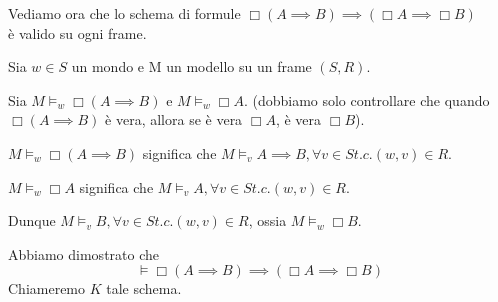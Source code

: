 \documentclass[../main.tex]{subfiles}
\begin{document}
Vediamo ora che lo schema di formule $\Box (A \implies B) \implies (\Box A \implies \Box B)$ \\
è valido su ogni frame.

Sia $w \in S$ un mondo e M un modello su un frame $(S,R)$.

Sia $M \vDash_w \Box (A \implies B)$ e $M \vDash_w \Box A$. (dobbiamo solo controllare che quando $\Box ( A \implies B )$ è vera, allora se è vera $\Box A$, è vera $\Box B$).

$M \vDash_w \Box (A \implies B)$ significa che $M \vDash_v A \implies B, \forall v \in S t.c. (w,v) \in R$.

$M \vDash_w \Box A$ significa che $M \vDash_v A, \forall v \in S t.c. (w,v) \in R$.

Dunque $M \vDash_v B, \forall v \in S t.c. (w,v) \in R$, ossia $M \vDash_w \Box B$.

Abbiamo dimostrato che
\begin{equation*}
    \vDash \Box (A \implies B) \implies (\Box A \implies \Box B)
\end{equation*}
Chiameremo $K$ tale schema.
\end{document}
